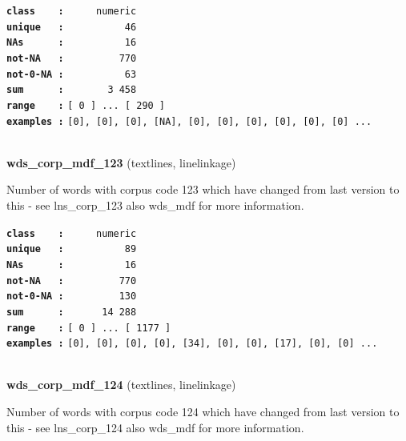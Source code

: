 \documentclass[]{article}
\begin{document}
\textbf{\texttt{class\ \ \ \ :}} \texttt{~~~~~numeric}\\
\textbf{\texttt{unique\ \ \ :}} \texttt{~~~~~~~~~~46}\\
\textbf{\texttt{NAs\ \ \ \ \ \ :}} \texttt{~~~~~~~~~~16}\\
\textbf{\texttt{not-NA\ \ \ :}} \texttt{~~~~~~~~~770}\\
\textbf{\texttt{not-0-NA\ :}} \texttt{~~~~~~~~~~63}\\
\textbf{\texttt{sum\ \ \ \ \ \ :}} \texttt{~~~~~~~3~458}\\
\textbf{\texttt{range\ \ \ \ :}}
\texttt{{[}\ 0\ {]}\ ...\ {[}\ 290\ {]}}\\
\textbf{\texttt{examples\ :}}
\texttt{{[}0{]},\ {[}0{]},\ {[}0{]},\ {[}NA{]},\ {[}0{]},\ {[}0{]},\ {[}0{]},\ {[}0{]},\ {[}0{]},\ {[}0{]}\ ...}\\

~

\textbf{wds\_corp\_mdf\_123} (textlines, linelinkage)

Number of words with corpus code 123 which have changed from last
version to this - see lns\_corp\_123 also wds\_mdf for more information.

\textbf{\texttt{class\ \ \ \ :}} \texttt{~~~~~numeric}\\
\textbf{\texttt{unique\ \ \ :}} \texttt{~~~~~~~~~~89}\\
\textbf{\texttt{NAs\ \ \ \ \ \ :}} \texttt{~~~~~~~~~~16}\\
\textbf{\texttt{not-NA\ \ \ :}} \texttt{~~~~~~~~~770}\\
\textbf{\texttt{not-0-NA\ :}} \texttt{~~~~~~~~~130}\\
\textbf{\texttt{sum\ \ \ \ \ \ :}} \texttt{~~~~~~14~288}\\
\textbf{\texttt{range\ \ \ \ :}}
\texttt{{[}\ 0\ {]}\ ...\ {[}\ 1177\ {]}}\\
\textbf{\texttt{examples\ :}}
\texttt{{[}0{]},\ {[}0{]},\ {[}0{]},\ {[}0{]},\ {[}34{]},\ {[}0{]},\ {[}0{]},\ {[}17{]},\ {[}0{]},\ {[}0{]}\ ...}\\

~

\textbf{wds\_corp\_mdf\_124} (textlines, linelinkage)

Number of words with corpus code 124 which have changed from last
version to this - see lns\_corp\_124 also wds\_mdf for more information.
\end{document}
